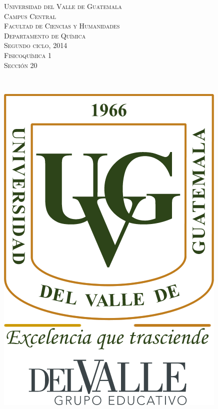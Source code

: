 \documentclass[a4paper,12pt]{article}
\begin{document}
\newcommand{\HRule}{\rule{\linewidth}{0.4mm}} %


\begin{minipage}{0.7\textwidth}
\begin{flushleft} 
\textsc{Universidad del Valle de Guatemala \\
Campus Central \\
Facultad de Ciencias y Humanidades \\
Departamento de Qu\'imica \\
Segundo ciclo, 2014 \\
Fisicoqu\'imica 1 \\
Secci\'on 20
}
\end{flushleft}
\end{minipage}
~
\begin{minipage}{0.2\textwidth}
\begin{flushright}
\includegraphics[scale=0.3]{Logo_UVG} %
\end{flushright}
\end{minipage}\\
\end{document}
